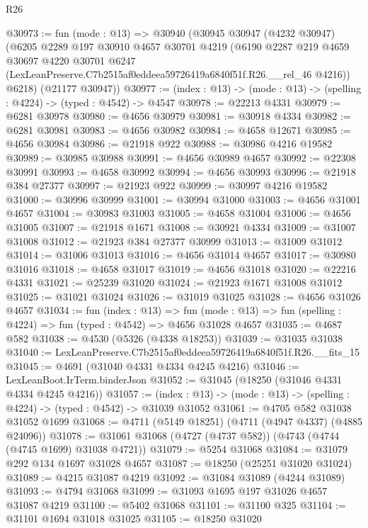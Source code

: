 \begin{lexlean}{R26}
\begin{coremodule}
@30973 := fun (mode : @13) =>
  @30940
    (@30945
      @30947
      (@4232 @30947)
      (@6205
        @2289
        @197
        @30910
        @4657
        @30701
        @4219
        (@6190
          @2287
          @219
          @4659
          @30697
          @4220
          @30701
          @6247
          (LexLeanPreserve.C7b2515af0eddeea59726419a6840f51f.R26.__rel_46 @4216))
        @6218)
      (@21177 @30947))
@30977 := (index : @13) -> (mode : @13) -> (spelling : @4224) -> (typed : @4542) -> @4547
@30978 := @22213 @4331
@30979 := @6281 @30978
@30980 := @4656 @30979
@30981 := @30918 @4334
@30982 := @6281 @30981
@30983 := @4656 @30982
@30984 := @4658 @12671
@30985 := @4656 @30984
@30986 := @21918 @922
@30988 := @30986 @4216 @19582
@30989 := @30985 @30988
@30991 := @4656 @30989 @4657
@30992 := @22308 @30991
@30993 := @4658 @30992
@30994 := @4656 @30993
@30996 := @21918 @384 @27377
@30997 := @21923 @922
@30999 := @30997 @4216 @19582
@31000 := @30996 @30999
@31001 := @30994 @31000
@31003 := @4656 @31001 @4657
@31004 := @30983 @31003
@31005 := @4658 @31004
@31006 := @4656 @31005
@31007 := @21918 @1671
@31008 := @30921 @4334
@31009 := @31007 @31008
@31012 := @21923 @384 @27377 @30999
@31013 := @31009 @31012
@31014 := @31006 @31013
@31016 := @4656 @31014 @4657
@31017 := @30980 @31016
@31018 := @4658 @31017
@31019 := @4656 @31018
@31020 := @22216 @4331
@31021 := @25239 @31020
@31024 := @21923 @1671 @31008 @31012
@31025 := @31021 @31024
@31026 := @31019 @31025
@31028 := @4656 @31026 @4657
@31034 := fun (index : @13) =>
  fun (mode : @13) => fun (spelling : @4224) => fun (typed : @4542) => @4656 @31028 @4657
@31035 := @4687 @582
@31038 := @4530 (@5326 (@4338 @18253))
@31039 := @31035 @31038
@31040 := LexLeanPreserve.C7b2515af0eddeea59726419a6840f51f.R26.__fits_15
@31045 := @4691 (@31040 @4331 @4334 @4245 @4216)
@31046 := LexLeanBoot.IrTerm.binderJson
@31052 := @31045 (@18250 (@31046 @4331 @4334 @4245 @4216))
@31057 := (index : @13) -> (mode : @13) -> (spelling : @4224) -> (typed : @4542) -> @31039 @31052
@31061 := @4705 @582 @31038 @31052 @1699
@31068 := @4711 (@5149 @18251) (@4711 (@4947 @4337) (@4885 @24096))
@31078 := @31061 @31068 (@4727 (@4737 @582)) (@4743 (@4744 (@4745 @1699) @31038 @4721))
@31079 := @5254 @31068
@31084 := @31079 @292 @134 @1697 @31028 @4657
@31087 := @18250 (@25251 @31020 @31024)
@31089 := @4215 @31087 @4219
@31092 := @31084 @31089 (@4244 @31089)
@31093 := @4794 @31068
@31099 := @31093 @1695 @197 @31026 @4657 @31087 @4219
@31100 := @5402 @31068
@31101 := @31100 @325
@31104 := @31101 @1694 @31018 @31025
@31105 := @18250 @31020

\end{coremodule}
\end{lexlean}
